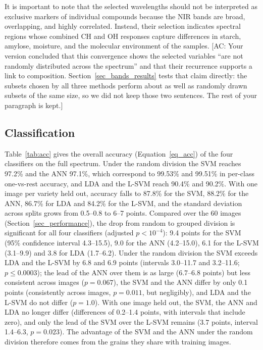\documentclass[final,5p,times,twocolumn]{elsarticle}
\newcommand{\added}[1]{{\color{blue}#1}}
\newcommand{\acnote}[1]{{\color{red}\small\textsf{[AC: #1]}}}
\begin{document}
It is important to note that the selected wavelengths should not be interpreted as exclusive markers of individual compounds because the NIR bands are broad, overlapping, and highly correlated. 
Instead, their selection indicates spectral regions whose combined CH and OH responses capture differences in starch, amylose, moisture, and the molecular environment of the samples.
\acnote{Your version concluded that this convergence shows the selected variables ``are not randomly distributed across the spectrum'' and that their recurrence supports a link to composition. Section~\ref{sec_bands_results} tests that claim directly: the subsets chosen by all three methods perform about as well as randomly drawn subsets of the same size, so we did not keep those two sentences. The rest of your paragraph is kept.}


\subsection{Classification}\label{sec_classification}


\added{Table~\ref{tab:acc} gives the overall accuracy (Equation~\ref{eq_acc}) of the four classifiers on the full spectrum. Under the random division the SVM reaches 97.2\% and the ANN 97.1\%, which correspond to 99.53\% and 99.51\% in per-class one-vs-rest accuracy, and LDA and the L-SVM reach 90.4\% and 90.2\%. With one image per variety held out, accuracy falls to 87.8\% for the SVM, 88.2\% for the ANN, 86.7\% for LDA and 84.2\% for the L-SVM, and the standard deviation across splits grows from 0.5--0.8 to 6--7 points. Compared over the 60 images (Section~\ref{sec_performance}), the drop from random to grouped division is significant for all four classifiers (adjusted $p<10^{-4}$): 9.4 points for the SVM (95\% confidence interval 4.3--15.5), 9.0 for the ANN (4.2--15.0), 6.1 for the L-SVM (3.1--9.9) and 3.8 for LDA (1.7--6.2). Under the random division the SVM exceeds LDA and the L-SVM by 6.8 and 6.9 points (intervals 3.0--11.7 and 3.2--11.6; $p\le0.0003$); the lead of the ANN over them is as large (6.7--6.8 points) but less consistent across images ($p=0.067$), the SVM and the ANN differ by only 0.1 points (consistently across images, $p=0.011$, but negligibly), and LDA and the L-SVM do not differ ($p=1.0$). With one image held out, the SVM, the ANN and LDA no longer differ (differences of 0.2--1.4 points, with intervals that include zero), and only the lead of the SVM over the L-SVM remains (3.7 points, interval 1.4--6.3, $p=0.023$). The advantage of the SVM and the ANN under the random division therefore comes from the grains they share with training images.}
\end{document}
